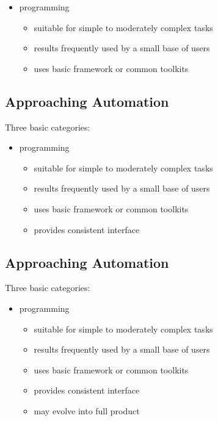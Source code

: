 \documentclass[xga]{xdvislides}
\begin{document}
\begin{itemize}
	\item programming
		\begin{itemize}
			\item suitable for simple to moderately complex tasks
			\item results frequently used by a small base of users
			\item uses basic framework or common toolkits
		\end{itemize}
\end{itemize}

\subsection{Approaching Automation}
Three basic categories:
\\

\begin{itemize}
	\item programming
		\begin{itemize}
			\item suitable for simple to moderately complex tasks
			\item results frequently used by a small base of users
			\item uses basic framework or common toolkits
			\item provides consistent interface
		\end{itemize}
\end{itemize}

\subsection{Approaching Automation}
Three basic categories:
\\

\begin{itemize}
	\item programming
		\begin{itemize}
			\item suitable for simple to moderately complex tasks
			\item results frequently used by a small base of users
			\item uses basic framework or common toolkits
			\item provides consistent interface
			\item may evolve into full product
		\end{itemize}
\end{itemize}
\end{document}
